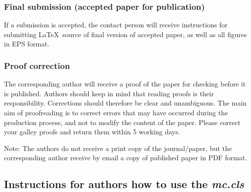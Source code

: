 \documentclass{mc}
\begin{document}
\subsubsection{Final submission (accepted paper for publication)}
 If a submission is accepted, the contact person will receive instructions for submitting \LaTeX\ source of final version of accepted paper, as well as all figures in EPS format.

\subsubsection{Proof correction}
 The corresponding author will receive a proof of the paper for checking before it is published. Authors should keep in mind that reading proofs is their responsibility. Corrections should therefore be clear and unambiguous. The main aim of proofreading is to correct errors that may have occurred during the production process, and not to modify the content of the paper. Please correct your galley proofs and return them within 5 working days.

Note: The authors do not receive a print copy of the journal/paper, but the corresponding author receive by email a copy of published paper in PDF format.




\subsection{Instructions for authors how to use the {\em mc.cls}  }
\end{document}
